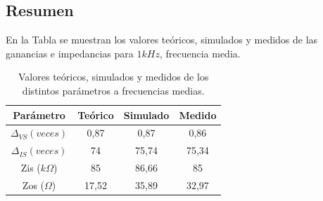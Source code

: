\subsection{Resumen}

En la Tabla \label{valores_frec_media} se muestran los valores teóricos, simulados y medidos de las ganancias e impedancias para $1kHz$, frecuencia media.

	\begin{table}[H]
		\centering
		\begin{tabular}{c c c c }
		\hline
		Parámetro   	   & Teórico & Simulado & Medido \\ \hline
		$\Delta _{VS} (veces)$ 	   & 0,87    & 0,87     & 0,86   \\%
		$\Delta_{IS} (veces)$	   & 74      & 75,74    & 75,34  \\ %
		Zis ($k\Omega$)  & 85      & 86,66    & 85     \\ %
		Zos  ($\Omega$) & 17,52   & 35,89    & 32,97  \\ \hline
		\end{tabular}
		\caption{Valores teóricos, simulados y medidos de los distintos parámetros a frecuencias medias.}
		\label{valores_frec_media}
	\end{table}
